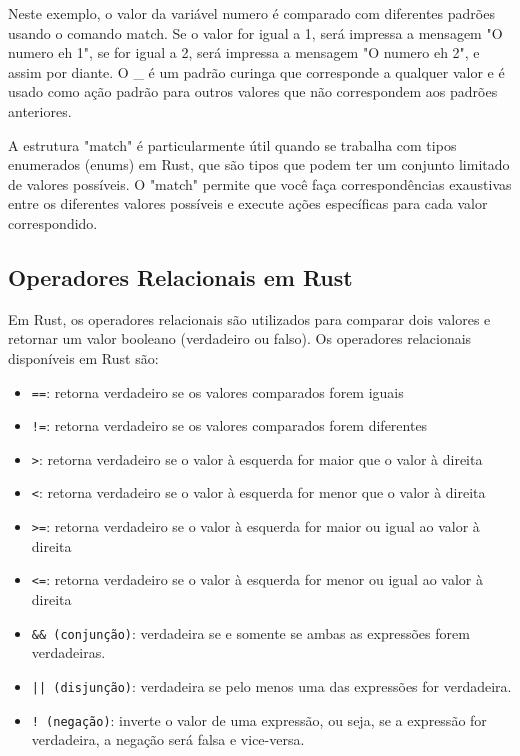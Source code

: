 \documentclass[12pt,a4paper,oneside]{abntex2}
\begin{document}
Neste exemplo, o valor da variável numero é comparado com diferentes padrões usando o comando match. Se o valor for igual a 1, será impressa a mensagem "O numero eh 1", se for igual a 2, será impressa a mensagem "O numero eh 2", e assim por diante. O \_ é um padrão curinga que corresponde a qualquer valor e é usado como ação padrão para outros valores que não correspondem aos padrões anteriores.


A estrutura "match" é particularmente útil quando se trabalha com tipos enumerados (enums) em Rust, que são tipos que podem ter um conjunto limitado de valores possíveis. O "match" permite que você faça correspondências exaustivas entre os diferentes valores possíveis e execute ações específicas para cada valor correspondido.

\subsection{Operadores Relacionais em Rust}

Em Rust, os operadores relacionais são utilizados para comparar dois valores e retornar um valor booleano (verdadeiro ou falso). Os operadores relacionais disponíveis em Rust são:

\begin{itemize}
\item \texttt{==}: retorna verdadeiro se os valores comparados forem iguais
\item \texttt{!=}: retorna verdadeiro se os valores comparados forem diferentes
\item \texttt{>}: retorna verdadeiro se o valor à esquerda for maior que o valor à direita
\item \texttt{<}: retorna verdadeiro se o valor à esquerda for menor que o valor à direita
\item \texttt{>=}: retorna verdadeiro se o valor à esquerda for maior ou igual ao valor à direita
\item \texttt{<=}: retorna verdadeiro se o valor à esquerda for menor ou igual ao valor à direita
\item \texttt{\&\& (conjunção)}: verdadeira se e somente se ambas as expressões forem verdadeiras.
\item \texttt{|| (disjunção)}: verdadeira se pelo menos uma das expressões for verdadeira.
\item \texttt{! (negação)}: inverte o valor de uma expressão, ou seja, se a expressão for verdadeira, a negação será falsa e vice-versa.

\end{itemize}
\end{document}
